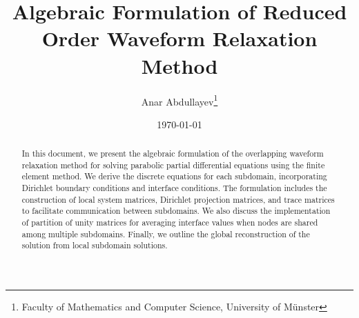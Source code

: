 \documentclass[a4paper, 11pt]{article}
\title{Algebraic Formulation of Reduced Order Waveform Relaxation Method}
\author{Anar Abdullayev\thanks{Faculty of Mathematics and Computer Science, University of Münster}}
\date{\today}
\theoremstyle{plain}
\theoremstyle{definition}
\theoremstyle{remark}
\begin{document}
\maketitle

\begin{abstract}
    In this document, we present the algebraic formulation of the overlapping waveform relaxation method for solving parabolic partial differential equations using the finite element method. We derive the discrete equations for each subdomain, incorporating Dirichlet boundary conditions and interface conditions. The formulation includes the construction of local system matrices, Dirichlet projection matrices, and trace matrices to facilitate communication between subdomains. We also discuss the implementation of partition of unity matrices for averaging interface values when nodes are shared among multiple subdomains. Finally, we outline the global reconstruction of the solution from local subdomain solutions.
\end{abstract}
\end{document}
